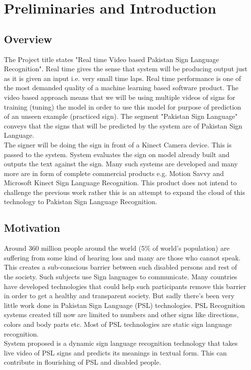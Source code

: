 \chapter{Preliminaries and Introduction\label{sec:introduction}}
\section{Overview}
The Project title states "Real time Video based Pakistan Sign Language Recognition". Real time gives the sense that system will be producing output just as it is given an input i.e. very small time laps. Real time performance is one of the most demanded quality of a machine learning based software product. The video based approach means that we will be using multiple videos of signs for training (tuning) the model in order to use this model for purpose of prediction of an unseen example (practiced sign). The segment "Pakistan Sign Language" conveys that the signs that will be predicted by the system are of Pakistan Sign Language.  \\
The signer will be doing the sign in front of a Kinect Camera device. This is passed to the system. System evaluates the sign on model already built and outputs the text against the sign. Many such systems are developed and many more are in form of complete commercial products e.g. Motion Savvy and Microsoft Kinect Sign Language Recognition. This product does not intend to challenge the previous work rather this is an attempt to expand the cloud of this technology to Pakistan Sign Language Recognition.


\section{Motivation}
Around 360 million people around the world (5\% of world’s population) are suffering from some kind of hearing loss and many are those who cannot speak. This creates a sub-conscious barrier between such disabled persons and rest of the society. Such subjects use Sign languages to communicate. Many countries have developed technologies that could help such participants remove this barrier in order to get a healthy and transparent society. But sadly there’s been very little work done in Pakistan Sign Language (PSL) technologies. PSL Recognition systems created till now are limited to numbers and other signs like directions, colors and body parts etc. Most of PSL technologies are static sign language recognition. \\
System proposed is a dynamic sign language recognition technology that takes live video of PSL signs and predicts its meanings in textual form. This can contribute in flourishing of PSL and disabled people. 


